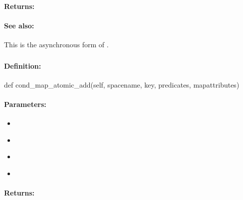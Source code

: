 \paragraph{Returns:}


\paragraph{See also:}  This is the asynchronous form of .

\pagebreak
\subsubsection{}
\label{api:python:cond_map_atomic_add}


\paragraph{Definition:}
\begin{pythoncode}
def cond_map_atomic_add(self, spacename, key, predicates, mapattributes)
\end{pythoncode}

\paragraph{Parameters:}
\begin{itemize}[noitemsep]
\item {}\\

\item {}\\

\item {}\\

\item {}\\

\end{itemize}

\paragraph{Returns:}



